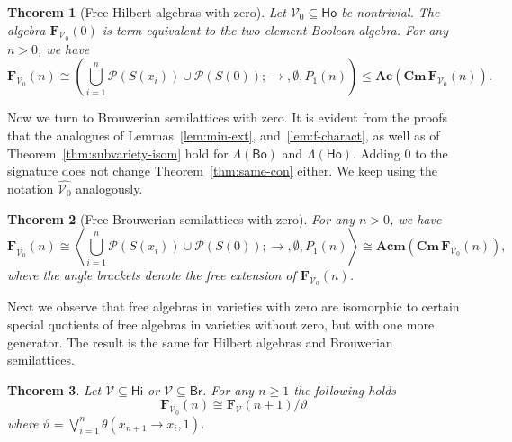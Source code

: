 \documentclass{amsart}
\newtheorem{theorem}{Theorem}[section]
\newcommand{\alg}[1]{\mathbf{#1}}
\newcommand{\var}[1]{\mathsf{#1}}
\newcommand{\FV}{\alg{F}_\mathcal{V}}
\newcommand{\FVo}{\alg{F}_{\mathcal{V}_0}}
\newcommand{\FVohat}{\alg{F}_{\widehat{\mathcal{V}_0}}}
\newcommand{\Cm}[1]{\mathbf{Cm}\, #1}
\def\ra{\rightarrow}
\def\pw{\mathscr{P}}
\begin{document}
\begin{theorem}[Free Hilbert algebras with zero]\label{thm:free-Hi0-alg}
Let $\mathcal{V}_0\subseteq \var{Ho}$ be nontrivial.  
The algebra $\FVo(0)$ is term-equivalent to the two-element Boolean algebra. 
For any $n > 0$, we have
$$
\FVo(n)\cong
\left(\bigcup_{i=1}^{n}\pw(S(x_i))\cup \pw(S(0));\ra,\emptyset,P_1(n)\right)
\leq \alg{Ac}(\Cm{\FVo(n)}).
$$
\end{theorem}  


Now we turn to Brouwerian semilattices with zero. It is evident from the proofs
that the analogues of  Lemmas~\ref{lem:min-ext}, and~\ref{lem:f-charact}, as well as 
of Theorem~\ref{thm:subvariety-isom} hold for
$\Lambda(\var{Bo})$ and $\Lambda(\var{Ho})$.
Adding $0$ to the signature does not change Theorem~\ref{thm:same-con} either.
We keep using the notation $\widehat{\mathcal{V}_0}$ analogously.

\begin{theorem}[Free Brouwerian semilattices with zero]\label{thm:free-Br-semi-0}
For any $n > 0$, we have
$$
\FVohat(n) \cong
\left\langle\bigcup_{i=1}^{n}\pw(S(x_i))\cup
  \pw(S(0));\ra,\emptyset,P_1(n)\right\rangle \cong \alg{Acm}(\Cm{\FVo}(n)),
$$
where the angle brackets denote the free extension of\/
$\FVo(n)$.
\end{theorem}  

Next we observe that free algebras in varieties with zero are isomorphic to
certain special quotients of free algebras in varieties without zero, but with
one more generator. The result is the same for Hilbert algebras and
Brouwerian semilattices.  

\begin{theorem}\label{thm:quotient}
Let $\mathcal{V}\subseteq\var{Hi}$ or $\mathcal{V}\subseteq\var{Br}$.
For any $n\geq 1$  the following holds
$$  
\FVo(n)\cong \FV(n+1)/\vartheta
$$
where $\vartheta = \bigvee_{i=1}^n\theta(x_{n+1}\ra x_i, 1)$.
\end{theorem}  
\end{document}
